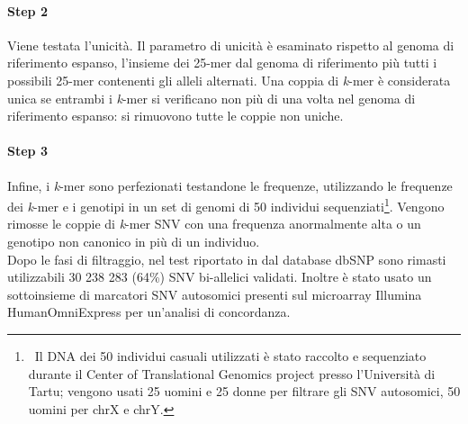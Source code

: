 \documentclass[../main.tex]{subfiles}
\begin{document}
\paragraph{Step 2} Viene testata l'unicità. Il parametro di unicità è esaminato rispetto al genoma di riferimento espanso, l'insieme dei 25-mer dal genoma di riferimento più tutti i possibili 25-mer contenenti gli alleli alternati. Una coppia di \textit{k}-mer è considerata unica se entrambi i \textit{k}-mer si verificano non più di una volta nel genoma di riferimento espanso: si rimuovono tutte le coppie non uniche.

\paragraph{Step 3} Infine, i \textit{k}-mer sono perfezionati testandone le frequenze, utilizzando le frequenze dei \textit{k}-mer e i genotipi in un set di genomi di 50 individui sequenziati\footnote{\ Il DNA dei 50 individui casuali utilizzati è stato raccolto e sequenziato durante il Center of Translational Genomics project presso l'Università di Tartu; vengono usati 25 uomini e 25 donne per filtrare gli SNV autosomici, 50 uomini per chrX e chrY. }. Vengono rimosse le coppie di \textit{k}-mer SNV con una frequenza anormalmente alta o un genotipo non canonico in più di un individuo. \\

\noindent
Dopo le fasi di filtraggio, nel test riportato in \cite{pajuste2017fastgt} dal database dbSNP sono rimasti utilizzabili 30 238 283 (64\%) SNV bi-allelici validati. Inoltre è stato usato un sottoinsieme di marcatori SNV autosomici presenti sul microarray Illumina HumanOmniExpress per un'analisi di concordanza.  \\
\end{document}
